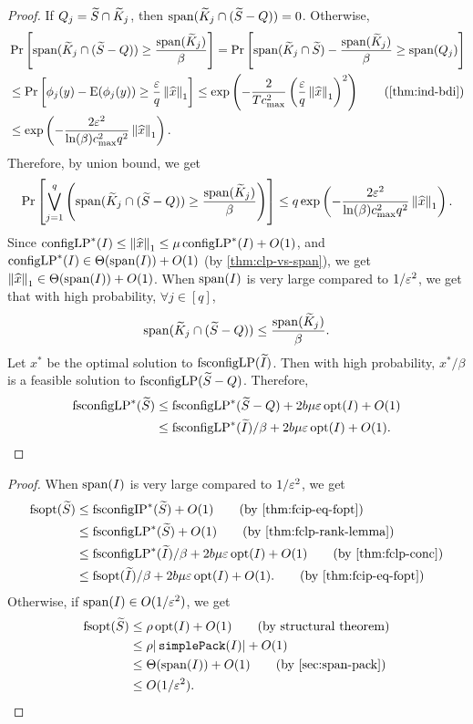 \begin{proof}
If $Q_j = \widetilde{S} \cap \widetilde{K}_j$, then $\operatorname{span}(\widetilde{K}_j \cap (\widetilde{S} - Q)) = 0$.
Otherwise,
\begin{align*}
& \Pr\left[ \Span(\Ktild_j \cap (\Stild - Q)) \ge \frac{\Span(\Ktild_j)}{\beta} \right]
= \Pr\left[ \Span(\Ktild_j \cap \Stild) - \frac{\Span(\Ktild_j)}{\beta} \ge \Span(Q_j) \right]
\\ &\le \Pr\left[ \phi_j(y) - \E(\phi_j(y)) \ge \frac{\epsLP}{q} \norm{\widehat{x}}_1 \right]
\le \exp\left( -\frac{2}{Tc_{\max}^2} \left(\frac{\epsLP}{q}\norm{\widehat{x}}_1\right)^2\right)
\tag{\cref{thm:ind-bdi}}
\\ &\le \exp\left( -\frac{2\epsLP^2}{\ln(\beta)c_{\max}^2q^2} \norm{\widehat{x}}_1\right).
\end{align*}
Therefore, by union bound, we get
\[ \Pr\left[ \bigvee_{j=1}^q \left(\operatorname{span}(\widetilde{K}_j \cap (\widetilde{S} - Q))
    \ge \frac{\operatorname{span}(\widetilde{K}_j)}{\beta}\right) \right]
\le q\exp\left( -\frac{2\varepsilon^2}{\ln(\beta)c_{\max}^2q^2} \left\lVert \widehat{x} \right\rVert_1\right). \]
Since $\operatorname{configLP}^*(I) \le \left\lVert \widehat{x} \right\rVert_1 \le \mu \operatorname{configLP}^*(I) + O(1)$,
and $\operatorname{configLP}^*(I) \in \Theta(\operatorname{span}(I)) + O(1)$ (by \cref{thm:clp-vs-span}),
we get $\left\lVert \widehat{x} \right\rVert_1 \in \Theta(\operatorname{span}(I)) + O(1)$.
When $\operatorname{span}(I)$ is very large compared to $1/\varepsilon^2$, we get
that with high probability, $\forall j \in [q]$,
\[ \operatorname{span}(\widetilde{K}_j \cap (\widetilde{S} - Q)) \le \frac{\operatorname{span}(\widetilde{K}_j)}{\beta}. \]
Let $x^*$ be the optimal solution to $\operatorname{fsconfigLP}(\widetilde{I})$.
Then with high probability, $x^*/\beta$ is a feasible solution to $\operatorname{fsconfigLP}(\widetilde{S} - Q)$.
Therefore,
\begin{align*}
\operatorname{fsconfigLP}^*(\widetilde{S})
&\le \operatorname{fsconfigLP}^*(\widetilde{S} - Q) + 2b\mu\varepsilon \operatorname{opt}(I) + O(1)
\\ &\le \operatorname{fsconfigLP}^*(\widetilde{I})/\beta + 2b\mu\varepsilon \operatorname{opt}(I) + O(1).
\qedhere \end{align*}
\end{proof}

\rthmFoptConc*
\begin{proof}
When $\operatorname{span}(I)$ is very large compared to $1/\varepsilon^2$, we get
\begin{align*}
\fsopt(\Stild) &\le \fscIP^*(\Stild) + O(1)  \tag{by \cref{thm:fcip-eq-fopt}}
\\ &\le \fscLP^*(\Stild) + O(1)  \tag{by \cref{thm:fclp-rank-lemma}}
\\ &\le \fscLP^*(\Itild)/\beta + 2b\mu\epsLP \opt(I) + O(1)  \tag{by \cref{thm:fclp-conc}}
\\ &\le \fsopt(\Itild)/\beta + 2b\mu\epsLP \opt(I) + O(1).  \tag{by \cref{thm:fcip-eq-fopt}}
\end{align*}
Otherwise, if $\operatorname{span}(I) \in O(1/\varepsilon^2)$, we get
\begin{align*}
\fsopt(\Stild) &\le \rho\opt(I) + O(1)  \tag{by structural theorem}
\\ &\le \rho|\simplePack(I)| + O(1)
\\ &\le \Theta(\Span(I)) + O(1)  \tag{by \cref{sec:span-pack}}
\\ &\le O(1/\epsLP^2).  \qedhere
\end{align*}
\end{proof}

